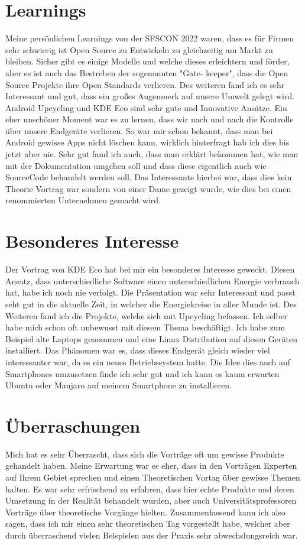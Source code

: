 \documentclass[10pt,ngerman]{scrartcl}
\begin{document}
\section*{Learnings}
Meine persönlichen Learnings von der SFSCON 2022 waren, dass es für Firmen sehr schwierig ist Open Source zu Entwickeln zu gleichzeitig am Markt zu bleiben. Sicher gibt es einige Modelle und welche dieses erleichtern und förder, aber es ist auch das Bestreben der sogenannten "Gate- keeper", dass die Open Source Projekte ihre Open Standards verlieren. Des weiteren fand ich es sehr Interessant und gut, dass ein großes Augenmerk auf unsere Umwelt gelegt wird. Android Upcycling und KDE Eco sind sehr gute und Innovative Ansätze. Ein eher unschöner Moment war es zu lernen, dass wir nach und nach die Kontrolle über unsere Endgeräte verlieren. So war mir schon bekannt, dass man bei Android gewisse Apps nicht löschen kann, wirklich hinterfragt hab ich dies bis jetzt aber nie. Sehr gut fand ich auch, dass man erklärt bekommen hat, wie man mit der Dokumentation umgehen soll und dass diese eigentlich auch wie SourceCode behandelt werden soll. Das Interessante hierbei war, dass dies kein Theorie Vortrag war sondern von einer Dame gezeigt wurde, wie dies bei einen renommierten Unternehmen gemacht wird.
\section*{Besonderes Interesse}
Der Vortrag von KDE Eco hat bei mir ein besonderes Interesse geweckt. Diesen Ansatz, dass unterschiedliche Software einen unterschiedlichen Energie verbrauch hat, habe ich noch nie verfolgt. Die Präsentation war sehr Interessant und passt seht gut in die aktuelle Zeit, in welcher die Energiekreise in aller Munde ist. Des Weiteren fand ich die Projekte, welche sich mit Upcycling befassen. Ich selber habe mich schon oft unbewusst mit diesem Thema beschäftigt. Ich habe zum Beispiel alte Laptops genommen und eine Linux Distribution auf diesen Geräten installiert. Das Phänomen war es, dass dieses Endgerät gleich wieder viel interessanter war, da es ein neues Betriebssystem hatte. Die Idee dies auch auf Smartphones umzusetzen finde ich sehr gut und ich kann es kaum erwarten Ubuntu oder Manjaro auf meinem Smartphone zu installieren.
\section*{Überraschungen}
Mich hat es sehr Überrascht, dass sich die Vorträge oft um gewisse Produkte gehandelt haben. Meine Erwartung war es eher, dass in den Vorträgen Experten auf Ihrem Gebiet sprechen und einen Theoretischen Vortag über gewisse Themen halten. Es war sehr erfrischend zu erfahren, dass hier echte Produkte und deren Umsetzung in der Realität behandelt wurden, aber auch Universitätsprofessoren Vorträge über theoretische Vorgänge hielten. Zusammenfassend kann ich also sagen, dass ich mir einen sehr theoretischen Tag vorgestellt habe, welcher aber durch überraschend vielen Beispielen aus der Praxis sehr abwechslungsreich war.
\end{document}
